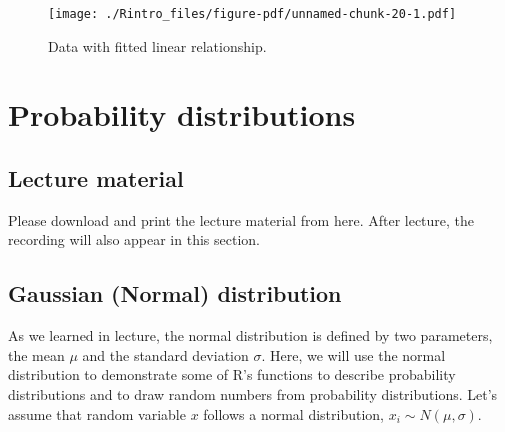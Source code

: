 \documentclass[
  letterpaper,
  DIV=11,
  numbers=noendperiod]{scrreprt}
\begin{document}
\begin{figure}[H]

{\centering \texttt{[image: ./Rintro\_files/figure-pdf/unnamed-chunk-20-1.pdf]}

}

\caption{Data with fitted linear relationship.}

\end{figure}

\hypertarget{probability-distributions}{%
\chapter{Probability distributions}\label{probability-distributions}}

\hypertarget{lecture-material}{%
\section{Lecture material}\label{lecture-material}}

Please download and print the lecture material from here. After lecture,
the recording will also appear in this section.

\hypertarget{gaussian-normal-distribution}{%
\section{Gaussian (Normal)
distribution}\label{gaussian-normal-distribution}}

As we learned in lecture, the normal distribution is defined by two
parameters, the mean \(\mu\) and the standard deviation \(\sigma\).
Here, we will use the normal distribution to demonstrate some of R's
functions to describe probability distributions and to draw random
numbers from probability distributions. Let's assume that random
variable \(x\) follows a normal distribution,
\(x_i \sim N(\mu, \sigma)\).
\end{document}
